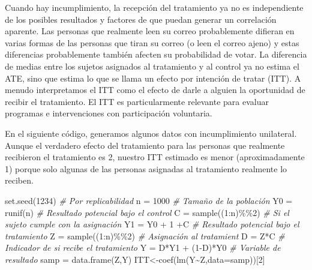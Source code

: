 \documentclass[
]{article}
\newenvironment{Shaded}{\begin{snugshade}}{\end{snugshade}}
\newcommand{\AttributeTok}[1]{\textcolor[rgb]{0.77,0.63,0.00}{#1}}
\newcommand{\CommentTok}[1]{\textcolor[rgb]{0.56,0.35,0.01}{\textit{#1}}}
\newcommand{\DecValTok}[1]{\textcolor[rgb]{0.00,0.00,0.81}{#1}}
\newcommand{\FunctionTok}[1]{\textcolor[rgb]{0.00,0.00,0.00}{#1}}
\newcommand{\NormalTok}[1]{#1}
\newcommand{\OtherTok}[1]{\textcolor[rgb]{0.56,0.35,0.01}{#1}}
\newcommand{\SpecialCharTok}[1]{\textcolor[rgb]{0.00,0.00,0.00}{#1}}
\begin{document}
Cuando hay incumplimiento, la recepción del tratamiento ya no es
independiente de los posibles resultados y factores de que puedan
generar un correlación aparente. Las personas que realmente leen su
correo probablemente difieran en varias formas de las personas que tiran
su correo (o leen el correo ajeno) y estas diferencias probablemente
también afecten su probabilidad de votar. La diferencia de medias entre
los sujetos asignados al tratamiento y al control ya no estima el ATE,
sino que estima lo que se llama un efecto por intención de tratar (ITT).
A menudo interpretamos el ITT como el efecto de darle a alguien la
oportunidad de recibir el tratamiento. El ITT es particularmente
relevante para evaluar programas e intervenciones con participación
voluntaria.

En el siguiente código, generamos algunos datos con incumplimiento
unilateral. Aunque el verdadero efecto del tratamiento para las personas
que realmente recibieron el tratamiento es 2, nuestro ITT estimado es
menor (aproximadamente 1) porque solo algunas de las personas asignadas
al tratamiento realmente lo reciben.

\begin{Shaded}
\begin{Highlighting}[]
\FunctionTok{set.seed}\NormalTok{(}\DecValTok{1234}\NormalTok{) }\CommentTok{\# Por replicabilidad}
\NormalTok{n }\OtherTok{=} \DecValTok{1000} \CommentTok{\# Tamaño de la población}
\NormalTok{Y0 }\OtherTok{=} \FunctionTok{runif}\NormalTok{(n) }\CommentTok{\# Resultado potencial bajo el control}
\NormalTok{C }\OtherTok{=} \FunctionTok{sample}\NormalTok{((}\DecValTok{1}\SpecialCharTok{:}\NormalTok{n)}\SpecialCharTok{\%\%}\DecValTok{2}\NormalTok{) }\CommentTok{\# Si el sujeto cumple con la asignación}
\NormalTok{Y1 }\OtherTok{=}\NormalTok{ Y0 }\SpecialCharTok{+} \DecValTok{1} \SpecialCharTok{+}\NormalTok{C }\CommentTok{\# Resultado potencial bajo el tratamiento }
\NormalTok{Z }\OtherTok{=} \FunctionTok{sample}\NormalTok{((}\DecValTok{1}\SpecialCharTok{:}\NormalTok{n)}\SpecialCharTok{\%\%}\DecValTok{2}\NormalTok{) }\CommentTok{\# Asignación al tratamient}
\NormalTok{D }\OtherTok{=}\NormalTok{ Z}\SpecialCharTok{*}\NormalTok{C }\CommentTok{\# Indicador de si recibe el tratamiento}
\NormalTok{Y }\OtherTok{=}\NormalTok{ D}\SpecialCharTok{*}\NormalTok{Y1 }\SpecialCharTok{+}\NormalTok{ (}\DecValTok{1}\SpecialCharTok{{-}}\NormalTok{D)}\SpecialCharTok{*}\NormalTok{Y0 }\CommentTok{\# Variable de resultado}
\NormalTok{samp }\OtherTok{=} \FunctionTok{data.frame}\NormalTok{(Z,Y)}
\NormalTok{ITT}\OtherTok{\textless{}{-}}\FunctionTok{coef}\NormalTok{(}\FunctionTok{lm}\NormalTok{(Y}\SpecialCharTok{\textasciitilde{}}\NormalTok{Z,}\AttributeTok{data=}\NormalTok{samp))[}\DecValTok{2}\NormalTok{]}
\end{Highlighting}
\end{Shaded}
\end{document}
